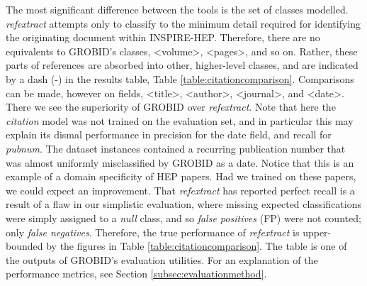The most significant difference between the tools is the set of classes modelled. \emph{refextract} attempts only to classify to the minimum detail required for identifying the originating document within INSPIRE-HEP. Therefore, there are no equivalents to GROBID's classes, <volume>, <pages>, and so on. Rather, these parts of references are absorbed into other, higher-level classes, and are indicated by a dash (-) in the results table, Table \ref{table:citationcomparison}. Comparisons can be made, however on fields, <title>, <author>, <journal>, and <date>. There we see the superiority of GROBID over \emph{refextract}. Note that here the \emph{citation} model was not trained on the evaluation set, and in particular this may explain its dismal performance in precision for the date field, and recall for \emph{pubnum}. The dataset instances contained a recurring publication number that was almost uniformly misclassified by GROBID as a date. Notice that this is an example of a domain specificity of HEP papers. Had we trained on these papers, we could expect an improvement. That \emph{refextract} has reported perfect recall is a result of a flaw in our simplistic evaluation, where missing expected classifications were simply assigned to a \emph{null} class, and so \emph{false positives} (FP) were not counted; only \emph{false negatives}. Therefore, the true performance of \emph{refextract} is upper-bounded by the figures in Table \ref{table:citationcomparison}. The table is one of the outputs of GROBID's evaluation utilities. For an explanation of the performance metrics, see Section \ref{subsec:evaluationmethod}.

